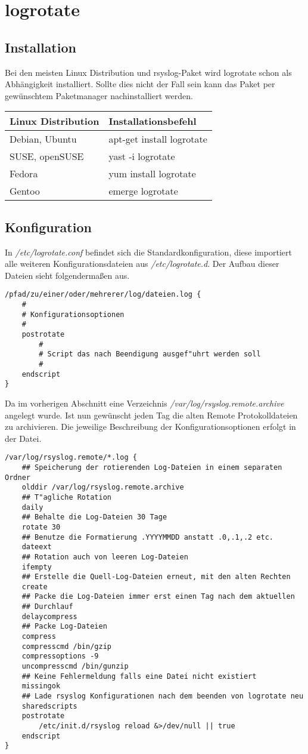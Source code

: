 \section{logrotate}
\subsection{Installation}
Bei den meisten Linux Distribution und rsyslog-Paket wird logrotate schon als Abhängigkeit installiert. Sollte dies nicht der Fall sein kann das Paket per gewünschtem Paketmanager nachinstalliert werden.

\begin{tabular}{ll}
	\hline
	Linux Distribution & Installationsbefehl\\
	\hline\hline
	Debian, Ubuntu & apt-get install logrotate\\
	SUSE, openSUSE & yast -i logrotate\\
	Fedora         & yum install logrotate\\
	Gentoo         & emerge logrotate\\
\end{tabular}

\subsection{Konfiguration}
In \textit{/etc/logrotate.conf} befindet sich die Standardkonfiguration, diese importiert alle weiteren Konfigurationsdateien aus \textit{/etc/logrotate.d}. Der Aufbau dieser Dateien sieht folgendermaßen aus.

\begin{lstlisting}
/pfad/zu/einer/oder/mehrerer/log/dateien.log {
	#	
	# Konfigurationsoptionen
	#
	postrotate
		#		
		# Script das nach Beendigung ausgef"uhrt werden soll
		#
	endscript
}
\end{lstlisting}

Da im vorherigen Abschnitt eine Verzeichnis \textit{/var/log/rsyslog.remote.archive} angelegt wurde. Ist nun gewünscht jeden Tag die alten Remote Protokolldateien zu archivieren. Die jeweilige Beschreibung der Konfigurationsoptionen erfolgt in der Datei.

\begin{lstlisting}
/var/log/rsyslog.remote/*.log {
	## Speicherung der rotierenden Log-Dateien in einem separaten Ordner
	olddir /var/log/rsyslog.remote.archive
	## T"agliche Rotation
	daily
	## Behalte die Log-Dateien 30 Tage
	rotate 30
	## Benutze die Formatierung .YYYYMMDD anstatt .0,.1,.2 etc.
	dateext
	## Rotation auch von leeren Log-Dateien
	ifempty
	## Erstelle die Quell-Log-Dateien erneut, mit den alten Rechten
	create
	## Packe die Log-Dateien immer erst einen Tag nach dem aktuellen
	## Durchlauf
	delaycompress
	## Packe Log-Dateien
	compress
	compresscmd /bin/gzip
	compressoptions -9
	uncompresscmd /bin/gunzip
	## Keine Fehlermeldung falls eine Datei nicht existiert
	missingok
	## Lade rsyslog Konfigurationen nach dem beenden von logrotate neu
	sharedscripts
	postrotate
		/etc/init.d/rsyslog reload &>/dev/null || true
	endscript
}
\end{lstlisting}